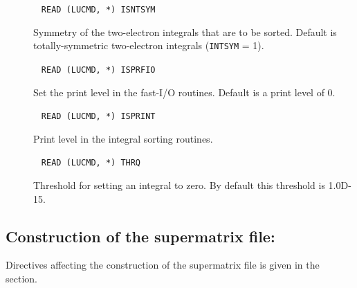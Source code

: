\begin{description}
\item[]

\item[]

\item[]\verb| |\newline
\verb|READ (LUCMD, *) ISNTSYM|

Symmetry of the two-electron integrals that are to be sorted.
Default is totally-symmetric two-electron integrals (\verb|INTSYM|
= 1).

\item[]\verb| |\newline
\verb|READ (LUCMD, *) ISPRFIO|

Set the print level in the fast-I/O routines. Default is a print level of 0.

\item[]

\item[]\verb| |\newline
\verb|READ (LUCMD, *) ISPRINT|

Print level in the integral sorting routines.

\item[]

\item[]\verb| |\newline
\verb|READ (LUCMD, *) THRQ|

Threshold for setting an integral to zero. By default this threshold
is 1.0D-15.

\end{description}

\subsection{Construction of the supermatrix file:
}\label{sec:supint}

Directives affecting the construction of the
supermatrix file is given
in the  section.

